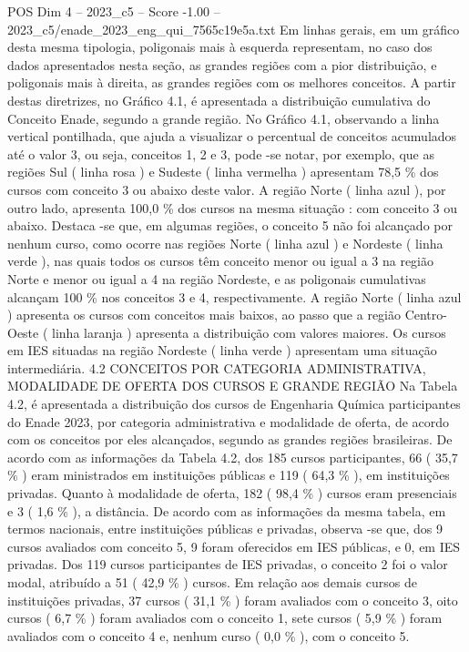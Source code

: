 \begin{textsample}{POS Dim 4 – 2023\_c5 – Score -1.00 – 2023\_c5/enade\_2023\_eng\_qui\_7565c19e5a.txt}
Em linhas gerais, em um gráfico desta mesma tipologia, poligonais mais à esquerda representam, no caso dos dados apresentados nesta seção, as grandes regiões com a pior distribuição, e poligonais mais à direita, as grandes regiões com os melhores conceitos.
A partir destas diretrizes, no Gráfico 4.1, é apresentada a distribuição cumulativa do Conceito Enade, segundo a grande região.
No Gráfico 4.1, observando a linha vertical pontilhada, que ajuda a visualizar o percentual de conceitos acumulados até o valor 3, ou seja, conceitos 1, 2 e 3, pode -se notar, por exemplo, que as regiões Sul ( linha rosa ) e Sudeste ( linha vermelha ) apresentam 78,5 \% dos cursos com conceito 3 ou abaixo deste valor.
A região Norte ( linha azul ), por outro lado, apresenta 100,0 \% dos cursos na mesma situação : com conceito 3 ou abaixo.
Destaca -se que, em algumas regiões, o conceito 5 não foi alcançado por nenhum curso, como ocorre nas regiões Norte ( linha azul ) e Nordeste ( linha verde ), nas quais todos os cursos têm conceito menor ou igual a 3 na região Norte e menor ou igual a 4 na região Nordeste, e as poligonais cumulativas alcançam 100 \% nos conceitos 3 e 4, respectivamente.
A região Norte ( linha azul ) apresenta os cursos com conceitos mais baixos, ao passo que a região Centro-Oeste ( linha laranja ) apresenta a distribuição com valores maiores.
Os cursos em IES situadas na região Nordeste ( linha verde ) apresentam uma situação intermediária. 4.2 CONCEITOS POR CATEGORIA ADMINISTRATIVA, MODALIDADE DE OFERTA DOS CURSOS E GRANDE REGIÃO Na Tabela 4.2, é apresentada a distribuição dos cursos de Engenharia Química participantes do Enade 2023, por categoria administrativa e modalidade de oferta, de acordo com os conceitos por eles alcançados, segundo as grandes regiões brasileiras.
De acordo com as informações da Tabela 4.2, dos 185 cursos participantes, 66 ( 35,7 \% ) eram ministrados em instituições públicas e 119 ( 64,3 \% ), em instituições privadas.
Quanto à modalidade de oferta, 182 ( 98,4 \% ) cursos eram presenciais e 3 ( 1,6 \% ), a distância.
De acordo com as informações da mesma tabela, em termos nacionais, entre instituições públicas e privadas, observa -se que, dos 9 cursos avaliados com conceito 5, 9 foram oferecidos em IES públicas, e 0, em IES privadas.
Dos 119 cursos participantes de IES privadas, o conceito 2 foi o valor modal, atribuído a 51 ( 42,9 \% ) cursos.
Em relação aos demais cursos de instituições privadas, 37 cursos ( 31,1 \% ) foram avaliados com o conceito 3, oito cursos ( 6,7 \% ) foram avaliados com o conceito 1, sete cursos ( 5,9 \% ) foram avaliados com o conceito 4 e, nenhum curso ( 0,0 \% ), com o conceito 5.

\end{textsample}
